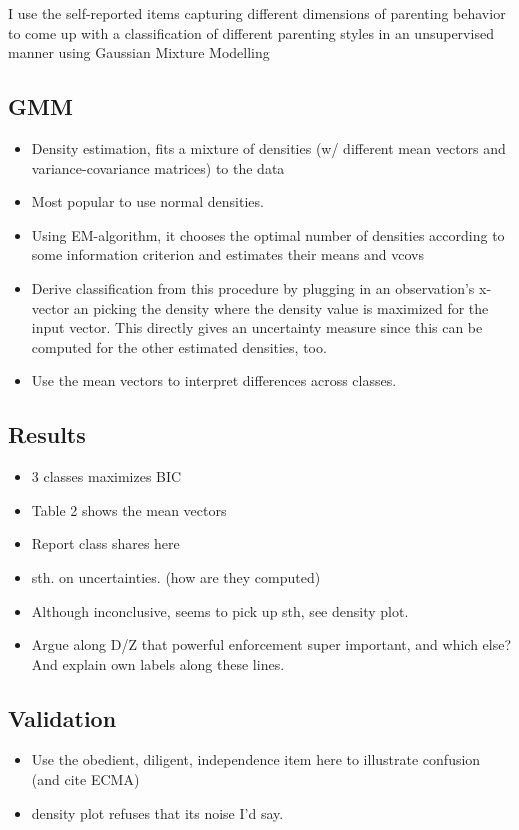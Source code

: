 I use the self-reported items capturing different dimensions of parenting behavior to come up with a classification of different parenting styles in an unsupervised manner using Gaussian Mixture Modelling

\subsection{GMM}
\begin{itemize}
	\item Density estimation, fits a mixture of densities (w/ different mean vectors and variance-covariance matrices) to the data
	\item Most popular to use normal densities.
	\item Using EM-algorithm, it chooses the optimal number of densities according to some information criterion
	and estimates their means and vcovs 
	\item Derive classification from this procedure by plugging in an observation's x-vector an picking the density where the density value is maximized for the input vector. This directly gives an uncertainty measure since this can be computed for the other estimated densities, too. 
	\item Use the mean vectors to interpret differences across classes.
\end{itemize}

\subsection{Results}
\begin{itemize}
	\item 3 classes maximizes BIC
	\item Table 2 shows the mean vectors
	\item Report class shares here
	\item sth. on uncertainties. (how are they computed)
	\item Although inconclusive, seems to pick up sth, see density plot.
	\item Argue along D/Z that powerful enforcement super important, and which else? And explain own labels along these lines.
\end{itemize}

\subsection{Validation}
\begin{itemize}
	\item Use the obedient, diligent, independence item here to illustrate confusion (and cite ECMA)
	\item density plot refuses that its noise I'd say.
\end{itemize}